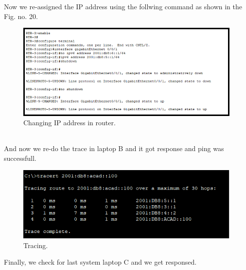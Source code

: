 \documentclass[12pt,a4paper]{article}
\begin{document}
Now we re-assigned the IP address using the follwing command as shown in the Fig. no.  20.\\
\begin{figure}[h]
 		\centering
				\includegraphics[scale=0.75]{5.112.png}


			\caption{Changing IP address in router.}
			\label{fig:AP}
	\end{figure}
\pagebreak \\
And now we re-do the  trace in laptop B and it got response and  ping was successfull. 
\begin{figure}[h]
 		\centering
				\includegraphics[scale=0.75]{5.12.png}	


			\caption{Tracing.}
			\label{fig:AP}
	\end{figure}

Finally, we check for last system laptop C and we get responsed.
\end{document}
